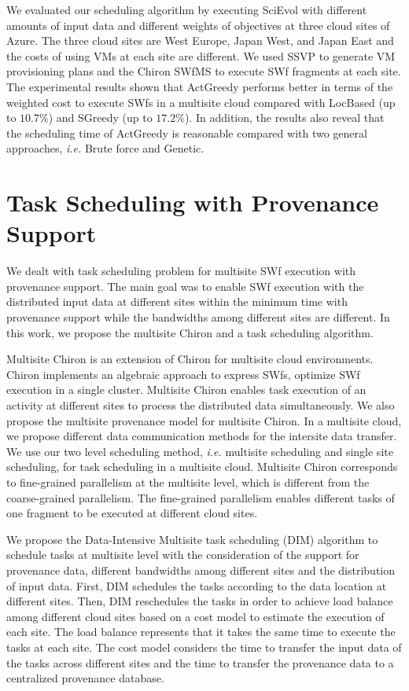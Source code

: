 We evaluated our scheduling algorithm by executing SciEvol with different amounts of input data and different weights of objectives at three cloud sites of Azure. The three cloud sites are West Europe, Japan West, and Japan East and the costs of using VMs at each site are different. We used SSVP to generate VM provisioning plans and the Chiron SWfMS to execute SWf fragments at each site.
The experimental results shown that ActGreedy performs better in terms of the weighted cost to execute SWfs in a multisite cloud compared with LocBased (up to $10.7\%$) and SGreedy (up to $17.2\%$). In addition, the results also reveal that the scheduling time of ActGreedy is reasonable compared with two general approaches, \textit{i.e.} Brute force and Genetic.

\section*{Task Scheduling with Provenance Support}

We dealt with task scheduling problem for multisite SWf execution with provenance support. The main goal was to enable SWf execution with the distributed input data at different sites within the minimum time with provenance support while the bandwidths among different sites are different. In this work, we propose the multisite Chiron and a task scheduling algorithm.

Multisite Chiron is an extension of Chiron for multisite cloud environments. Chiron implements an algebraic approach to express SWfs, optimize SWf execution in a single cluster. Multisite Chiron enables task execution of an activity at different sites to process the distributed data simultaneously. We also propose the multisite provenance model for multisite Chiron. In a multisite cloud, we propose different data communication methods for the intersite data transfer. We use our two level scheduling method, \textit{i.e.} multisite scheduling and single site scheduling, for task scheduling in a multisite cloud.  Multisite Chiron corresponds to fine-grained parallelism at the multisite level, which is different from the coarse-grained parallelism. The fine-grained parallelism enables different tasks of one fragment to be executed at different cloud sites.

We propose the Data-Intensive Multisite task scheduling (DIM) algorithm to schedule tasks at multisite level with the consideration of the support for provenance data, different bandwidths among different sites and the distribution of input data. First, DIM schedules the tasks according to the data location at different sites. Then, DIM reschedules the tasks in order to achieve load balance among different cloud sites based on a cost model to estimate the execution of each site. The load balance represents that it takes the same time to execute the tasks at each site. The cost model considers the time to transfer the input data of the tasks across different sites and the time to transfer the provenance data to a centralized provenance database.

